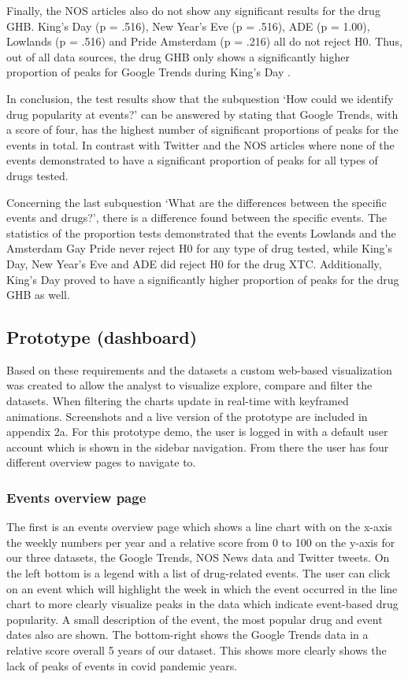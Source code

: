 Finally, the NOS articles also do not show any significant results for the drug GHB. King’s Day (p = .516), New Year’s Eve (p = .516), ADE (p = 1.00), Lowlands (p = .516) and Pride Amsterdam (p = .216) all do not reject H0. Thus, out of all data sources, the drug GHB only shows a significantly higher proportion of peaks for Google Trends during King’s Day . 

In conclusion, the test results show that the subquestion ‘How could we identify drug popularity at events?’ can be answered by stating that Google Trends, with a score of four, has the highest number of significant proportions of peaks for the events in total. In contrast with Twitter and the NOS articles where none of the events demonstrated to have a significant proportion of peaks for all types of drugs tested. 

Concerning the last subquestion ‘What are the differences between the specific events and drugs?’, there is a difference found between the specific events. The statistics of the proportion tests demonstrated that the events Lowlands and the Amsterdam Gay Pride never reject H0 for any type of drug tested, while King’s Day, New Year’s Eve and ADE did reject H0 for the drug XTC. Additionally, King’s Day proved to have a significantly higher proportion of peaks for the drug GHB as well.


\subsection {Prototype (dashboard)}\hfill

\noindent Based on these requirements and the datasets a custom web-based visualization was created to allow the analyst to visualize explore, compare and filter the datasets. When filtering the charts update in real-time with keyframed animations. Screenshots and a live version of the prototype are included in appendix 2a. For this prototype demo, the user is logged in with a default user account which is shown in the sidebar navigation. From there the user has four different overview pages to navigate to. 

\subsubsection{Events overview page}
The first is an events overview page which shows a line chart with on the x-axis the weekly numbers per year and a relative score from 0 to 100 on the y-axis for our three datasets, the Google Trends, NOS News data and Twitter tweets. On the left bottom is a legend with a list of drug-related events. The user can click on an event which will highlight the week in which the event occurred in the line chart to more clearly visualize peaks in the data which indicate event-based drug popularity. A small description of the event, the most popular drug and event dates also are shown. The bottom-right shows the Google Trends data in a relative score overall 5 years of our dataset. This shows more clearly shows the lack of peaks of events in covid pandemic years.


